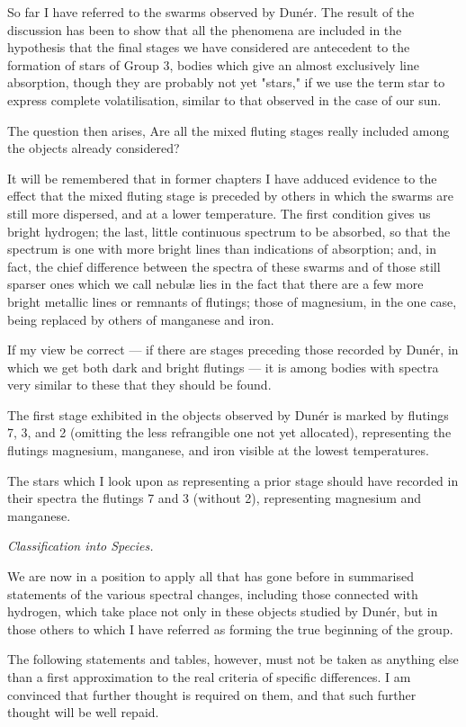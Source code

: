 \documentclass[a4paper, 12pt, oneside, polutonikogreek, english]{article}
\begin{document}
So far I have referred to the swarms observed by Dunér. The result of the discussion has been to show that all the phenomena are included in the hypothesis that the final stages we have considered are antecedent to the formation of stars of Group 3, bodies which give an almost exclusively line absorption, though they are probably not yet "stars," if we use the term star to express complete volatilisation, similar to that observed in the case of our sun.

The question then arises, Are all the mixed fluting stages really included among the objects already considered?

It will be remembered that in former chapters I have adduced evidence to the effect that the mixed fluting stage is preceded by others in which the swarms are still more dispersed, and at a lower temperature. The first condition gives us bright hydrogen; the last, little continuous spectrum to be absorbed, so that the spectrum is one with more bright lines than indications of absorption; and, in fact, the chief difference between the spectra of these swarms and of those still sparser ones which we call nebulæ lies in the fact that there are a few more bright metallic lines or remnants of flutings; those of magnesium, in the one case, being replaced by others of manganese and iron.

If my view be correct --- if there are stages preceding those recorded by Dunér, in which we get both dark and bright flutings --- it is among bodies with spectra very similar to these that they should be found.

The first stage exhibited in the objects observed by Dunér is marked by flutings 7, 3, and 2 (omitting the less refrangible one not yet allocated), representing the flutings magnesium, manganese, and iron visible at the lowest temperatures.

The stars which I look upon as representing a prior stage should have recorded in their spectra the flutings 7 and 3 (without 2), representing magnesium and manganese.

\emph{Classification into Species.}

We are now in a position to apply all that has gone before in summarised statements of the various spectral changes, including those connected with hydrogen, which take place not only in these objects studied by Dunér, but in those others to which I have referred as forming the true beginning of the group.

The following statements and tables, however, must not be taken as anything else than a first approximation to the real criteria of specific differences. I am convinced that further thought is required on them, and that such further thought will be well repaid.
\end{document}
